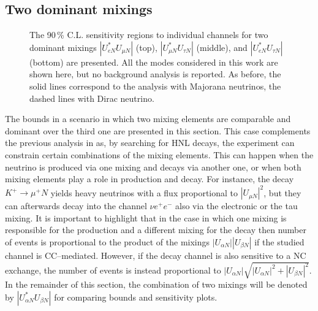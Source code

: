 \subsection{Two dominant mixings}
\label{sec:bimax}

\begin{figure}
	\centering
	{\resizebox{\linewidth}{!}{}}
	\vspace{0.05em}

	{\resizebox{\linewidth}{!}{}}
	\vspace{0.05em}

	{\resizebox{\linewidth}{!}{}}
	\caption[Sensitivity regions to individual channels for two dominant mixings]%
		{The 90\,\% C.L. sensitivity regions to individual channels for two dominant mixings %
		$|U_{e N}^* U_{\mu N}|$ (top), $|U_{\mu N}^* U_{\tau N}|$ (middle), and $|U_{e N}^* U_{\tau N}|$ (bottom) are presented.
		All the modes considered in this work are shown here, but no background analysis is reported.
		As before, the solid lines correspond to the analysis with Majorana neutrinos, the dashed lines with Dirac neutrino.}
	\label{fig:senseMix}
\end{figure}

The bounds in a scenario in which two mixing elements are comparable and dominant over the third one are presented in this section.
This case complements the previous analysis in  as, by searching for HNL decays, %
the experiment can constrain certain combinations of the mixing elements.
This can happen when the neutrino is produced via one mixing and decays via another one, %
or when both mixing elements play a role in production and decay.
For instance, the decay $K^+ \to \mu^+ N$ yields heavy neutrinos with a flux proportional to %
$|U_{\mu N}|^2$, but they can afterwards decay into the channel $\nu e^+ e^-$ also via the electronic or the tau mixing.
It is important to highlight that in the case in which one mixing is responsible %
for the production and a different mixing for the decay %
then number of events is proportional to the product of the mixings %
$|U_{\alpha N}||U_{\beta N}|$ if the studied channel is CC--mediated.
However, if the decay channel is also sensitive to a NC exchange, the number of events is instead proportional to %
$|U_{\alpha N}|\sqrt{|U_{\alpha N}|^2 + |U_{\beta N}|^2}$.
In the remainder of this section, the combination of two mixings will be denoted by $|U_{\alpha N}^* U_{\beta N}|$ %
for comparing bounds and sensitivity plots.

